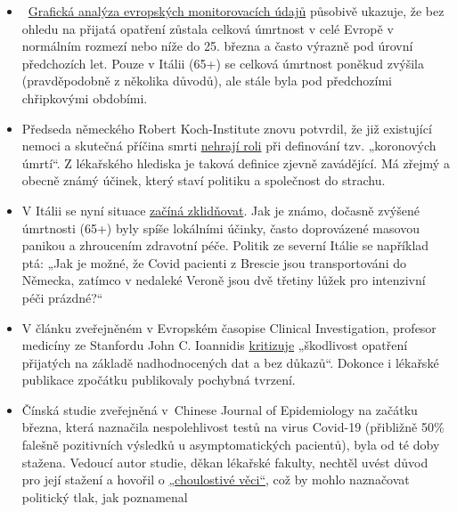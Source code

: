 \begin{itemize}
\tightlist
\item
  ~\href{https://off-guardian.org/2020/03/30/covid19-yet-to-impact-europes-overall-mortality/}{Grafická
  analýza evropských monitorovacích údajů} působivě ukazuje, že bez
  ohledu na přijatá opatření zůstala celková úmrtnost v celé Evropě v
  normálním rozmezí nebo níže do 25. března a často výrazně pod úrovní
  předchozích let. Pouze v Itálii (65+) se celková úmrtnost poněkud
  zvýšila (pravděpodobně z několika důvodů), ale stále byla pod
  předchozími chřipkovými obdobími.
\item
  Předseda německého Robert Koch-Institute znovu potvrdil, že již
  existující nemoci a skutečná příčina smrti
  \href{https://swprs.org/rki-relativiert-corona-todesfaelle/}{nehrají
  roli} při definování tzv. „koronových úmrtí``. Z lékařského hlediska
  je taková definice zjevně zavádějící. Má zřejmý a obecně známý účinek,
  který staví politiku a společnost do strachu.
\item
  V Itálii se nyní situace
  \href{https://www.tagesspiegel.de/politik/die-verlangsamung-ist-da-in-italien-zeichnet-sich-die-wende-in-der-coronakrise-ab/25698124.html}{začíná
  zklidňovat}. Jak je známo, dočasně zvýšené úmrtnosti (65+) byly spíše
  lokálními účinky, často doprovázené masovou panikou a zhroucením
  zdravotní péče. Politik ze severní Itálie se například ptá: „Jak je
  možné, že Covid pacienti z Brescie jsou transportováni do Německa,
  zatímco v nedaleké Veroně jsou dvě třetiny lůžek pro intenzivní péči
  prázdné?``
\item
  V článku zveřejněném v Evropském časopise Clinical Investigation,
  profesor medicíny ze Stanfordu John C. Ioannidis
  \href{https://onlinelibrary.wiley.com/doi/abs/10.1111/eci.13222}{kritizuje}
  „škodlivost opatření přijatých na základě nadhodnocených dat a bez
  důkazů``. Dokonce i lékařské publikace zpočátku publikovaly pochybná
  tvrzení.
\item
  Čínská studie zveřejněná v~Chinese Journal of Epidemiology na začátku
  března, která naznačila nespolehlivost testů na virus Covid-19
  (přibližně 50\% falešně pozitivních výsledků u asymptomatických
  pacientů), byla od té doby stažena. Vedoucí autor studie, děkan
  lékařské fakulty, nechtěl uvést důvod pro její stažení a hovořil o
  \href{https://www.npr.org/sections/health-shots/2020/03/26/822084429/in-defense-of-coronavirus-testing-strategy-administration-cited-retracted-study}{„choulostivé
  věci``}, což by mohlo naznačovat politický tlak, jak poznamenal

\end{itemize}
